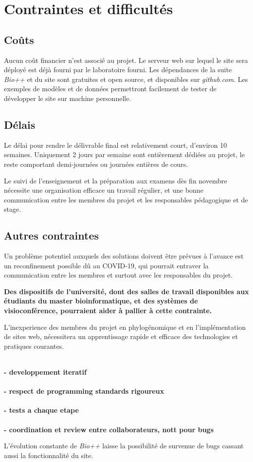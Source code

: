 \section{Contraintes et difficultés}

\subsection{Coûts}

Aucun coût financier n'est associé au projet.
Le serveur web sur lequel le site sera déployé est déjà fourni par le laboratoire fourni.
Les dépendances de la suite \textit{Bio++} et du site sont gratuites et open source,
et disponibles sur \textit{github.com}.
Les exemples de modèles et de données permettront facilement
de tester de développer le site sur machine personnelle.


\subsection{Délais}

Le délai pour rendre le délivrable final est relativement court,
d'environ 10 semaines.
Uniquement 2 jours par semaine sont entièrement dédiées au projet,
le reste comportant demi-journées ou journées entières de cours.

Le suivi de l'enseignement et la préparation
aux examens dès fin novembre
nécessite une organisation efficace
un travail régulier,
et une bonne communication entre les membres du projet
et les responsables pédagogique et de stage.


\subsection{Autres contraintes}

Un problème potentiel auxquels des solutions doivent être prévues à l'avance
est un reconfinement possible dû au COVID-19,
qui pourrait entraver la communication entre les membres
et surtout avec les responsables du projet.

\textbf{
Des dispositifs de l'université,
dont des salles de travail disponibles aux étudiants du master bioinformatique,
et des systèmes de visioconférence,
pourraient aider à pallier à cette contrainte.
}

L'inexperience des membres du projet en phylogénomique
et en l'implémentation de sites web,
nécessitera un apprentissage rapide et efficace
des technologies et pratiques courantes.

\textbf{\\
- developpement iteratif\\
\\
- respect de programming standards rigoureux\\
\\
- tests a chaque etape\\
\\
- coordination et review entre collaborateurs, nott pour bugs\\
}

L'évolution constante de \textit{Bio++}
laisse la possibilité de survenue de bugs
cassant aussi la fonctionnalité du site.
